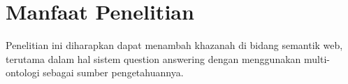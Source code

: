 \section{Manfaat Penelitian}
Penelitian ini diharapkan dapat menambah khazanah di bidang semantik web, terutama dalam hal sistem question answering dengan menggunakan multi-ontologi sebagai sumber pengetahuannya.